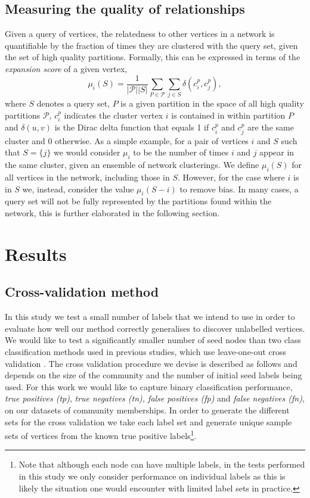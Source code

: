 \documentclass[sigconf]{acmart}
\begin{document}
\subsection{Measuring the quality of relationships} \label{sec:expansion}
Given a query of vertices, the relatedness to other vertices in a network is quantifiable by the fraction of times they are clustered with the query set, given the set of high quality partitions.
Formally, this can be expressed in terms of the \textit{expansion score} of a given vertex,
\begin{equation} \label{eq:mu_score}
\mu_i(S) = \frac{1}{|\mathcal{P}| |S| } \sum_{P \in \mathcal{P}} \sum_{j \in S} \delta(c^{p}_i, c^{p}_j),
\end{equation}
where $S$ denotes a query set, $P$ is a given partition in the space of all high quality partitions $\mathcal{P}$, $c^{p}_{i}$ indicates the cluster vertex $i$ is contained in within partition $P$ and
$\delta(u, v)$ is the Dirac delta function that equals 1 if $c^{p}_i$ and  $c^{p}_j$ are the same cluster and $0$ otherwise.
As a simple example, for a pair of vertices $i$ and $S$ such that $S = \{j\}$ we would consider $\mu_i$ to be the number of times $i$ and $j$ appear in the same cluster, given an ensemble of network clusterings.
We define $\mu_i(S)$ for all vertices in the network, including those in $S$.
However, for the case where $i$ is in $S$ we, instead, consider the value $\mu_i(S - i)$ to remove bias.
In many cases, a query set will not be fully represented by the partitions found within the network, this is further elaborated in the following section.

\section{Results}
\subsection{Cross-validation method}
\label{sec:cross_validation}
In this study we test a small number of labels that we intend to use in order to evaluate how well our method correctly generalises to discover unlabelled vertices.
We would like to test a significantly smaller number of seed nodes than two class classification methods used in previous studies, which use leave-one-out cross validation \cite{kohler2008walking}.
The cross validation procedure we devise is described as follows and depends on the size of the community and the number of initial seed labels being used.
For this work we would like to capture binary classification  performance, \textit{true positives (tp)}, \textit{true negatives (tn), false positives (fp)} and \textit{false negatives (fn)}, on our datasets of community memberships.
In order to generate the different sets for the cross validation we take each label set and generate unique sample sets of vertices from the known true positive labels\footnote{Note that although each node can have multiple labels, in the tests performed in this study we only consider performance on individual labels as this is likely the situation one would encounter with limited label sets in practice.}.
\end{document}

